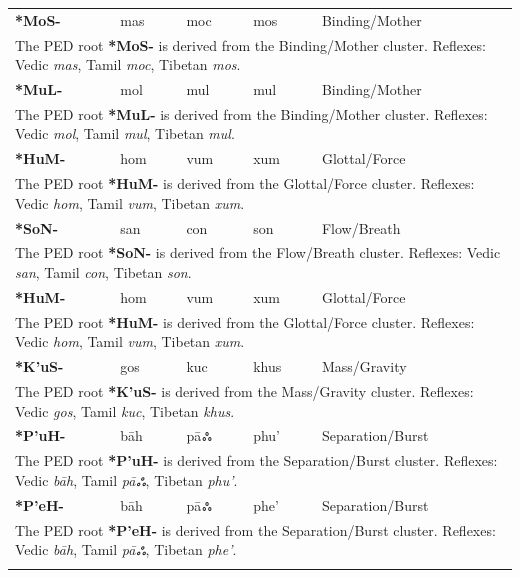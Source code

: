 \begin{longtable}{p{} p{} p{} p{} p{}}
\textbf{*MoS-} & mas & moc & mos & Binding/Mother \\ 
\multicolumn{5}{p{\textwidth}}{\small The PED root \textbf{*MoS-} is derived from the Binding/Mother cluster. Reflexes: Vedic \textit{mas}, Tamil \textit{moc}, Tibetan \textit{mos}. } \\ \addlinespace 
\textbf{*MuL-} & mol & mul & mul & Binding/Mother \\ 
\multicolumn{5}{p{\textwidth}}{\small The PED root \textbf{*MuL-} is derived from the Binding/Mother cluster. Reflexes: Vedic \textit{mol}, Tamil \textit{mul}, Tibetan \textit{mul}. } \\ \addlinespace 
\textbf{*HuM-} & hom & vum & xum & Glottal/Force \\ 
\multicolumn{5}{p{\textwidth}}{\small The PED root \textbf{*HuM-} is derived from the Glottal/Force cluster. Reflexes: Vedic \textit{hom}, Tamil \textit{vum}, Tibetan \textit{xum}. } \\ \addlinespace 
\textbf{*SoN-} & san & con & son & Flow/Breath \\ 
\multicolumn{5}{p{\textwidth}}{\small The PED root \textbf{*SoN-} is derived from the Flow/Breath cluster. Reflexes: Vedic \textit{san}, Tamil \textit{con}, Tibetan \textit{son}. } \\ \addlinespace 
\textbf{*HuM-} & hom & vum & xum & Glottal/Force \\ 
\multicolumn{5}{p{\textwidth}}{\small The PED root \textbf{*HuM-} is derived from the Glottal/Force cluster. Reflexes: Vedic \textit{hom}, Tamil \textit{vum}, Tibetan \textit{xum}. } \\ \addlinespace 
\textbf{*K'uS-} & gos & kuc & khus & Mass/Gravity \\ 
\multicolumn{5}{p{\textwidth}}{\small The PED root \textbf{*K'uS-} is derived from the Mass/Gravity cluster. Reflexes: Vedic \textit{gos}, Tamil \textit{kuc}, Tibetan \textit{khus}. } \\ \addlinespace 
\textbf{*P'uH-} & bāh & pāஃ & phu' & Separation/Burst \\ 
\multicolumn{5}{p{\textwidth}}{\small The PED root \textbf{*P'uH-} is derived from the Separation/Burst cluster. Reflexes: Vedic \textit{bāh}, Tamil \textit{pāஃ}, Tibetan \textit{phu'}. } \\ \addlinespace 
\textbf{*P'eH-} & bāh & pāஃ & phe' & Separation/Burst \\ 
\multicolumn{5}{p{\textwidth}}{\small The PED root \textbf{*P'eH-} is derived from the Separation/Burst cluster. Reflexes: Vedic \textit{bāh}, Tamil \textit{pāஃ}, Tibetan \textit{phe'}. } \\ \addlinespace 

\end{longtable}
